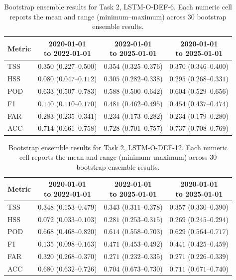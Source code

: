 \begin{table}[htbp]
\centering
\small
\caption{Bootstrap ensemble results for Task 2, LSTM-O-DEF-6. Each numeric cell reports the mean and range (minimum--maximum) across 30 bootstrap ensemble results.}
\label{tab:app-task2-lstm-o-def-6}
\begin{tabular}{lccc}
\toprule
Metric & \shortstack{2020-01-01\\to 2022-01-01} & \shortstack{2022-01-01\\to 2025-01-01} & \shortstack{2020-01-01\\to 2025-01-01} \\
\midrule
TSS & $0.350$ ($0.227$--$0.500$) & $0.354$ ($0.325$--$0.376$) & $0.370$ ($0.346$--$0.400$) \\
HSS & $0.080$ ($0.047$--$0.112$) & $0.305$ ($0.282$--$0.338$) & $0.295$ ($0.268$--$0.331$) \\
POD & $0.633$ ($0.507$--$0.783$) & $0.588$ ($0.500$--$0.642$) & $0.604$ ($0.529$--$0.656$) \\
F1 & $0.140$ ($0.110$--$0.170$) & $0.481$ ($0.462$--$0.495$) & $0.454$ ($0.437$--$0.474$) \\
FAR & $0.283$ ($0.235$--$0.341$) & $0.234$ ($0.173$--$0.282$) & $0.234$ ($0.179$--$0.280$) \\
ACC & $0.714$ ($0.661$--$0.758$) & $0.728$ ($0.701$--$0.757$) & $0.737$ ($0.708$--$0.769$) \\
\bottomrule
\end{tabular}
\end{table}
\clearpage

\begin{table}[htbp]
\centering
\small
\caption{Bootstrap ensemble results for Task 2, LSTM-O-DEF-12. Each numeric cell reports the mean and range (minimum--maximum) across 30 bootstrap ensemble results.}
\label{tab:app-task2-lstm-o-def-12}
\begin{tabular}{lccc}
\toprule
Metric & \shortstack{2020-01-01\\to 2022-01-01} & \shortstack{2022-01-01\\to 2025-01-01} & \shortstack{2020-01-01\\to 2025-01-01} \\
\midrule
TSS & $0.348$ ($0.153$--$0.479$) & $0.343$ ($0.311$--$0.378$) & $0.357$ ($0.330$--$0.390$) \\
HSS & $0.072$ ($0.033$--$0.103$) & $0.281$ ($0.253$--$0.315$) & $0.269$ ($0.245$--$0.294$) \\
POD & $0.668$ ($0.468$--$0.820$) & $0.614$ ($0.558$--$0.703$) & $0.629$ ($0.564$--$0.717$) \\
F1 & $0.135$ ($0.098$--$0.163$) & $0.471$ ($0.453$--$0.492$) & $0.441$ ($0.425$--$0.459$) \\
FAR & $0.320$ ($0.268$--$0.370$) & $0.271$ ($0.232$--$0.335$) & $0.271$ ($0.226$--$0.339$) \\
ACC & $0.680$ ($0.632$--$0.726$) & $0.704$ ($0.673$--$0.730$) & $0.711$ ($0.671$--$0.740$) \\
\bottomrule
\end{tabular}
\end{table}
\clearpage


